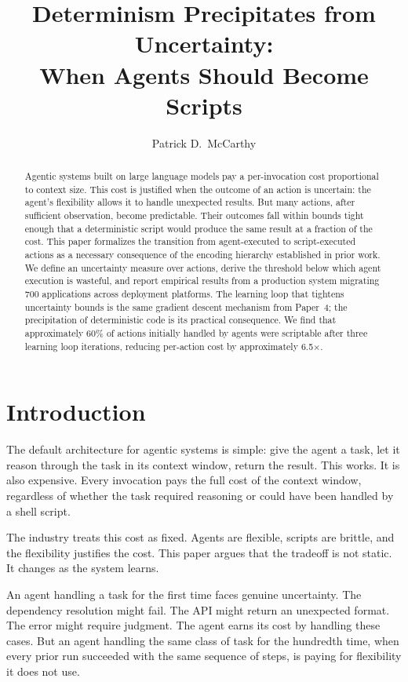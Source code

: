 \documentclass[11pt]{article}
\title{Determinism Precipitates from Uncertainty:\\When Agents Should Become Scripts}
\author{Patrick D.\ McCarthy}
\date{}
\theoremstyle{definition}
\begin{document}
\maketitle

\begin{abstract}
Agentic systems built on large language models pay a per-invocation cost
proportional to context size. This cost is justified when the outcome of
an action is uncertain: the agent's flexibility allows it to handle
unexpected results. But many actions, after sufficient observation,
become predictable. Their outcomes fall within bounds tight enough that
a deterministic script would produce the same result at a fraction of
the cost. This paper formalizes the transition from agent-executed to
script-executed actions as a necessary consequence of the encoding
hierarchy established in prior work. We define an uncertainty measure
over actions, derive the threshold below which agent execution is
wasteful, and report empirical results from a production system
migrating 700 applications across deployment platforms. The learning
loop that tightens uncertainty bounds is the same gradient descent
mechanism from Paper~4; the precipitation of deterministic code is its
practical consequence. We find that approximately 60\% of actions initially handled by
agents were scriptable after three learning loop iterations, reducing
per-action cost by approximately 6.5$\times$.
\end{abstract}

\section{Introduction}
\label{sec:intro}

The default architecture for agentic systems is simple: give the agent
a task, let it reason through the task in its context window, return
the result. This works. It is also expensive. Every invocation pays the
full cost of the context window, regardless of whether the task required
reasoning or could have been handled by a shell script.

The industry treats this cost as fixed. Agents are flexible, scripts are
brittle, and the flexibility justifies the cost. This paper argues that
the tradeoff is not static. It changes as the system learns.

An agent handling a task for the first time faces genuine uncertainty.
The dependency resolution might fail. The API might return an unexpected
format. The error might require judgment. The agent earns its cost by
handling these cases. But an agent handling the same class of task for
the hundredth time, when every prior run succeeded with the same
sequence of steps, is paying for flexibility it does not use.
\end{document}
